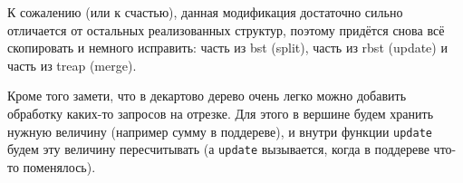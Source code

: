 К сожалению (или к счастью), данная модификация достаточно сильно отличается от остальных реализованных структур, поэтому придётся снова всё скопировать и немного исправить: часть из bst (split), часть из rbst (update) и часть из treap (merge).

Кроме того замети, что в декартово дерево очень легко можно добавить обработку каких-то запросов на отрезке. Для этого в вершине будем хранить нужную величину (например сумму в поддереве), и внутри функции \texttt{update} будем эту величину пересчитывать (а \texttt{update} вызывается, когда в поддереве что-то поменялось).
